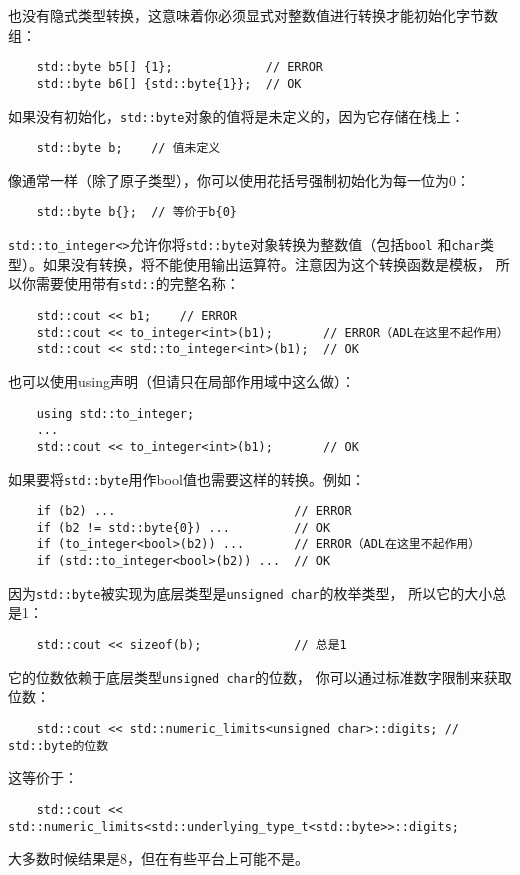 也没有隐式类型转换，这意味着你必须显式对整数值进行转换才能初始化字节数组：
\begin{lstlisting}
    std::byte b5[] {1};             // ERROR
    std::byte b6[] {std::byte{1}};  // OK
\end{lstlisting}
如果没有初始化，\texttt{std::byte}对象的值将是未定义的，因为它存储在栈上：
\begin{lstlisting}
    std::byte b;    // 值未定义
\end{lstlisting}
像通常一样（除了原子类型），你可以使用花括号强制初始化为每一位为0：
\begin{lstlisting}
    std::byte b{};  // 等价于b{0}
\end{lstlisting}
\texttt{std::to\_integer<>}允许你将\texttt{std::byte}对象转换为整数值（包括\texttt{bool}
和\texttt{char}类型）。如果没有转换，将不能使用输出运算符。注意因为这个转换函数是模板，
所以你需要使用带有\texttt{std::}的完整名称：
\begin{lstlisting}
    std::cout << b1;    // ERROR
    std::cout << to_integer<int>(b1);       // ERROR（ADL在这里不起作用）
    std::cout << std::to_integer<int>(b1);  // OK
\end{lstlisting}
也可以使用using声明（但请只在局部作用域中这么做）：
\begin{lstlisting}
    using std::to_integer;
    ...
    std::cout << to_integer<int>(b1);       // OK
\end{lstlisting}
如果要将\texttt{std::byte}用作bool值也需要这样的转换。例如：
\begin{lstlisting}
    if (b2) ...                         // ERROR
    if (b2 != std::byte{0}) ...         // OK
    if (to_integer<bool>(b2)) ...       // ERROR（ADL在这里不起作用）
    if (std::to_integer<bool>(b2)) ...  // OK
\end{lstlisting}
因为\texttt{std::byte}被实现为底层类型是\texttt{unsigned char}的枚举类型，
所以它的大小总是1：
\begin{lstlisting}
    std::cout << sizeof(b);             // 总是1
\end{lstlisting}
它的位数依赖于底层类型\texttt{unsigned char}的位数，
你可以通过标准数字限制来获取位数：
\begin{lstlisting}
    std::cout << std::numeric_limits<unsigned char>::digits; // std::byte的位数
\end{lstlisting}
这等价于：
\begin{lstlisting}
    std::cout << std::numeric_limits<std::underlying_type_t<std::byte>>::digits;
\end{lstlisting}
大多数时候结果是8，但在有些平台上可能不是。


